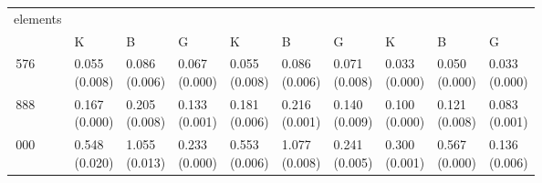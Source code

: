 \begin{table}[H]\centering\begin{tabular}{>{\centering\arraybackslash}m{1.2cm}|>{\centering\arraybackslash}m{1.25cm}>{\centering\arraybackslash}m{1.25cm}>{\centering\arraybackslash}m{1.25cm}|>{\centering\arraybackslash}m{1.25cm}>{\centering\arraybackslash}m{1.25cm}>{\centering\arraybackslash}m{1.25cm}|>{\centering\arraybackslash}m{1.25cm}>{\centering\arraybackslash}m{1.25cm}>{\centering\arraybackslash}m{1.25cm}}
\toprule
elements & \multicolumn{3}{|c}{gravity} & \multicolumn{3}{|c}{traction} & \multicolumn{3}{|c}{compression} \\
 & K & B & G & K & B & G & K & B & G \\
\midrule
24\,576 & \makecell{0.055\\[-4pt](0.008)} & \makecell{0.086\\[-4pt](0.006)} & \makecell{0.067\\[-4pt](0.000)} & \makecell{0.055\\[-4pt](0.008)} & \makecell{0.086\\[-4pt](0.006)} & \makecell{0.071\\[-4pt](0.008)} & \makecell{0.033\\[-4pt](0.000)} & \makecell{0.050\\[-4pt](0.000)} & \makecell{0.033\\[-4pt](0.000)} \\
63\,888 & \makecell{0.167\\[-4pt](0.000)} & \makecell{0.205\\[-4pt](0.008)} & \makecell{0.133\\[-4pt](0.001)} & \makecell{0.181\\[-4pt](0.006)} & \makecell{0.216\\[-4pt](0.001)} & \makecell{0.140\\[-4pt](0.009)} & \makecell{0.100\\[-4pt](0.000)} & \makecell{0.121\\[-4pt](0.008)} & \makecell{0.083\\[-4pt](0.001)} \\
162\,000 & \makecell{0.548\\[-4pt](0.020)} & \makecell{1.055\\[-4pt](0.013)} & \makecell{0.233\\[-4pt](0.000)} & \makecell{0.553\\[-4pt](0.006)} & \makecell{1.077\\[-4pt](0.008)} & \makecell{0.241\\[-4pt](0.005)} & \makecell{0.300\\[-4pt](0.001)} & \makecell{0.567\\[-4pt](0.000)} & \makecell{0.136\\[-4pt](0.006)} \\

\end{tabular}
\end{table}
